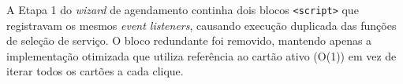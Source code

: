 A Etapa 1 do \textit{wizard} de agendamento continha dois blocos
\texttt{<script>} que registravam os mesmos \textit{event listeners}, causando
execução duplicada das funções de seleção de serviço. O bloco redundante foi
removido, mantendo apenas a implementação otimizada que utiliza referência ao
cartão ativo (O(1)) em vez de iterar todos os cartões a cada clique.


%
